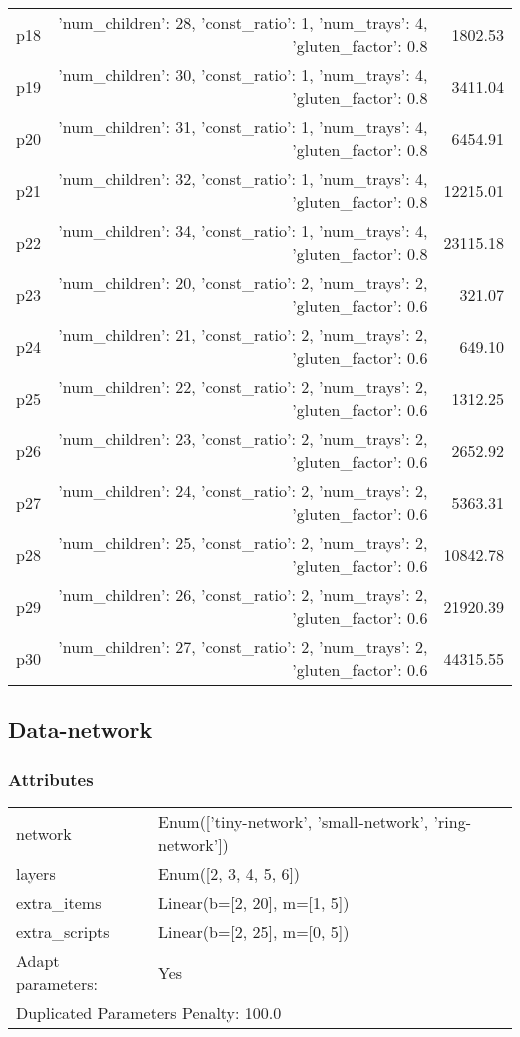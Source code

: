 \documentclass{article}
\begin{document}
\begin{center}
\begin{tabular}{@{}l|r|r@{}}
  p18&{'num\_children': 28, 'const\_ratio': 1, 'num\_trays': 4, 'gluten\_factor': 0.8}&1802.53\\
  p19&{'num\_children': 30, 'const\_ratio': 1, 'num\_trays': 4, 'gluten\_factor': 0.8}&3411.04\\
  p20&{'num\_children': 31, 'const\_ratio': 1, 'num\_trays': 4, 'gluten\_factor': 0.8}&6454.91\\
  p21&{'num\_children': 32, 'const\_ratio': 1, 'num\_trays': 4, 'gluten\_factor': 0.8}&12215.01\\
  p22&{'num\_children': 34, 'const\_ratio': 1, 'num\_trays': 4, 'gluten\_factor': 0.8}&23115.18\\
  p23&{'num\_children': 20, 'const\_ratio': 2, 'num\_trays': 2, 'gluten\_factor': 0.6}&321.07\\
  p24&{'num\_children': 21, 'const\_ratio': 2, 'num\_trays': 2, 'gluten\_factor': 0.6}&649.10\\
  p25&{'num\_children': 22, 'const\_ratio': 2, 'num\_trays': 2, 'gluten\_factor': 0.6}&1312.25\\
  p26&{'num\_children': 23, 'const\_ratio': 2, 'num\_trays': 2, 'gluten\_factor': 0.6}&2652.92\\
  p27&{'num\_children': 24, 'const\_ratio': 2, 'num\_trays': 2, 'gluten\_factor': 0.6}&5363.31\\
  p28&{'num\_children': 25, 'const\_ratio': 2, 'num\_trays': 2, 'gluten\_factor': 0.6}&10842.78\\
  p29&{'num\_children': 26, 'const\_ratio': 2, 'num\_trays': 2, 'gluten\_factor': 0.6}&21920.39\\
  p30&{'num\_children': 27, 'const\_ratio': 2, 'num\_trays': 2, 'gluten\_factor': 0.6}&44315.55
                            \end{tabular}
                            \end{center}
                    
                            \newpage \subsection{Data-network}
                    \subsubsection*{Attributes}
                    \begin{tabular}{@{}p{}p{}@{}}
                    \toprule
                    network & Enum(['tiny-network', 'small-network', 'ring-network'])\\
layers & Enum([2, 3, 4, 5, 6])\\
extra\_items & Linear(b=[2, 20], m=[1, 5])\\
extra\_scripts & Linear(b=[2, 25], m=[0, 5])
                    \\\midrule
                    Adapt parameters: & Yes \\
                    \bottomrule
                    \multicolumn{2}{l}{Duplicated Parameters Penalty: 100.0}
                    \end{tabular}
                
\end{document}
